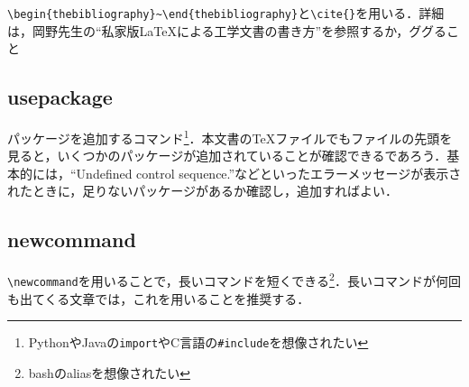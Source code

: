 \documentclass[11pt,a4paper]{jsarticle}
\begin{document}
\verb|\begin{thebibliography}~\end{thebibliography}|と\verb|\cite{}|を用いる．詳細は，岡野先生の``私家版\LaTeX による工学文書の書き方''を参照するか，ググること

\subsection{usepackage}

パッケージを追加するコマンド\footnote{PythonやJavaの\verb|import|やC言語の\verb|#include|を想像されたい}．本文書の\TeX ファイルでもファイルの先頭を見ると，いくつかのパッケージが追加されていることが確認できるであろう．基本的には，``Undefined control sequence.''などといったエラーメッセージが表示されたときに，足りないパッケージがあるか確認し，追加すればよい．

\subsection{newcommand}

\verb|\newcommand|を用いることで，長いコマンドを短くできる\footnote{bashのaliasを想像されたい}．長いコマンドが何回も出てくる文章では，これを用いることを推奨する．
\end{document}
